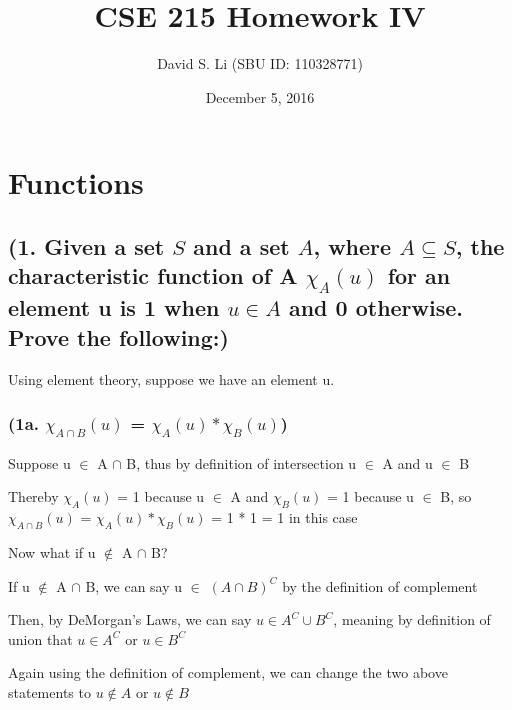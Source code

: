 \documentclass{article}
\title{CSE 215 Homework IV}
\author{David S. Li (SBU ID: 110328771)}
\date{December 5, 2016}
\begin{document}
\maketitle

\section{Functions}
\subsection{(1. Given a set $S$ and a set $A$, where $A \subseteq S$, the characteristic function of A $\chi_{A}(u)$ for an element u is 1 when $u \in A$ and 0 otherwise.  Prove the following:)}

Using element theory, suppose we have an element u. \par\vspace{0.5cm}


\subsubsection{(1a. $\chi_{A\cap B}(u)$ = $\chi_{A}(u) * \chi_{B}(u)$)}

Suppose u $\in$ A $\cap$ B, thus by definition of intersection u $\in$ A and u $\in$ B \par\vspace{0.5cm}

\noindent Thereby $\chi_{A}(u)$ = 1 because u $\in$ A and $\chi_{B}(u)$  = 1 because u $\in$ B, so $\chi_{A\cap B}(u)$ = $\chi_{A}(u) * \chi_{B}(u)$ = 1 * 1 = 1 in this case \par\vspace{0.5cm}

\noindent Now what if u $\notin$ A $\cap$ B? \par\vspace{0.5cm}

\noindent If u $\notin$ A $\cap$ B, we can say u $\in$ $(A \cap B)^{C}$ by the definition of complement \par\vspace{0.5cm}

\noindent Then, by DeMorgan's Laws, we can say $u \in A^{C} \cup B^{C}$, meaning by definition of union that $u \in A^{C}$ or $u \in B^{C}$ \par\vspace{0.5cm}

\noindent Again using the definition of complement, we can change the two above statements to $u \notin A$ or $u \notin B$  \par\vspace{0.5cm}
\end{document}
